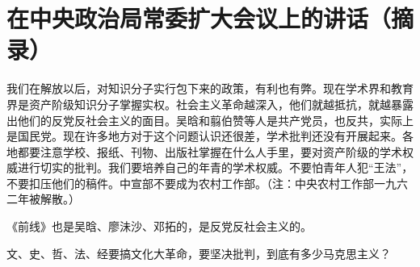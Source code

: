 \section[在中央政治局常委扩大会议上的讲话（摘录）（一九六六年三月十七日至二十日）]{在中央政治局常委扩大会议上的讲话（摘录）}


我们在解放以后，对知识分子实行包下来的政策，有利也有弊。现在学术界和教育界是资产阶级知识分子掌握实权。社会主义革命越深入，他们就越抵抗，就越暴露出他们的反党反社会主义的面目。吴晗和翦伯赞等人是共产党员，也反共，实际上是国民党。现在许多地方对于这个问题认识还很差，学术批判还没有开展起来。各地都要注意学校、报纸、刊物、出版社掌握在什么人手里，要对资产阶级的学术权威进行切实的批判。我们要培养自己的年青的学术权威。不要怕青年人犯“王法”，不要扣压他们的稿件。中宣部不要成为农村工作部。（注：中央农村工作部一九六二年被解散。）

《前线》也是吴晗、廖沬沙、邓拓的，是反党反社会主义的。

文、史、哲、法、经要搞文化大革命，要坚决批判，到底有多少马克思主义？

